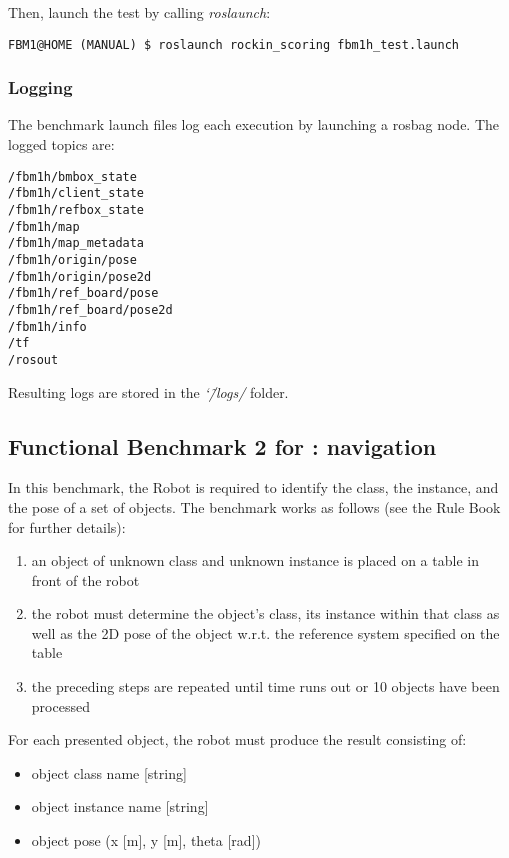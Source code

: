 \documentclass[a4paper]{article}
\newcommand{\logdir}{\char`\~/logs/}
\begin{document}
Then, launch the test by calling \emph{roslaunch}:
\begin{verbatim}
FBM1@HOME (MANUAL) $ roslaunch rockin_scoring fbm1h_test.launch
\end{verbatim}

\clearpage

\subsubsection{Logging}

The benchmark launch files log each execution by launching a rosbag node.
The logged topics are:

\begin{verbatim}
/fbm1h/bmbox_state
/fbm1h/client_state
/fbm1h/refbox_state
/fbm1h/map
/fbm1h/map_metadata
/fbm1h/origin/pose
/fbm1h/origin/pose2d
/fbm1h/ref_board/pose
/fbm1h/ref_board/pose2d
/fbm1h/info
/tf
/rosout
\end{verbatim}

Resulting logs are stored in the \emph{\logdir} folder.

\clearpage


\subsection{Functional Benchmark 2 for \ro@Home: navigation}
\label{sec:fbm2h}
In this benchmark, the Robot is required to identify the class, the instance, and the pose of a set of objects.
The benchmark works as follows (see the Rule Book for further details):

\begin{enumerate}
  \item an object of unknown class and unknown instance is placed on a table in front of the robot
  \item the robot must determine the object’s class, its instance within that class as well as the 2D pose of the object w.r.t. the reference system specified on the table
  \item the preceding steps are repeated until time runs out or 10 objects have been processed
\end{enumerate}

For each presented object, the robot must produce the result consisting of:
\begin{itemize}
  \item object class name [string]
  \item object instance name [string]
  \item object pose (x [m], y [m], theta [rad])
\end{itemize}
\end{document}
